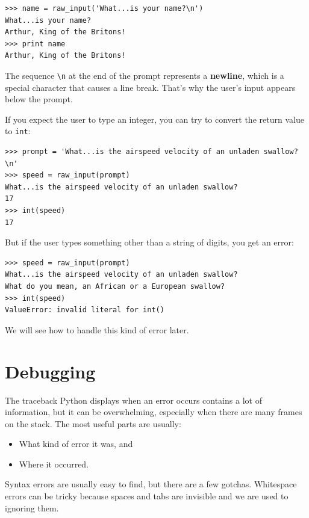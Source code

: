 \documentclass[10pt]{book}
\begin{document}
\begin{CJK}{UTF8}{gbsn}
\begin{verbatim}
>>> name = raw_input('What...is your name?\n')
What...is your name?
Arthur, King of the Britons!
>>> print name
Arthur, King of the Britons!
\end{verbatim}
%
The sequence \verb"\n" at the end of the prompt represents a {\bf newline},
which is a special character that causes a line break.
That's why the user's input appears below the prompt.

If you expect the user to type an integer, you can try to convert
the return value to {\tt int}:

\begin{verbatim}
>>> prompt = 'What...is the airspeed velocity of an unladen swallow?\n'
>>> speed = raw_input(prompt)
What...is the airspeed velocity of an unladen swallow?
17
>>> int(speed)
17
\end{verbatim}
%
But if the user types something other than a string of digits,
you get an error:

\begin{verbatim}
>>> speed = raw_input(prompt)
What...is the airspeed velocity of an unladen swallow?
What do you mean, an African or a European swallow?
>>> int(speed)
ValueError: invalid literal for int()
\end{verbatim}
%
We will see how to handle this kind of error later.


\section{Debugging}
\label{whitespace}

The traceback Python displays when an error occurs contains
a lot of information, but it can be overwhelming, especially
when there are many frames on the stack.  The most
useful parts are usually:

\begin{itemize}

\item What kind of error it was, and

\item Where it occurred.

\end{itemize}

Syntax errors are usually easy to find, but there are a few
gotchas.  Whitespace errors can be tricky because spaces and
tabs are invisible and we are used to ignoring them.


\end{CJK}
\end{document}
